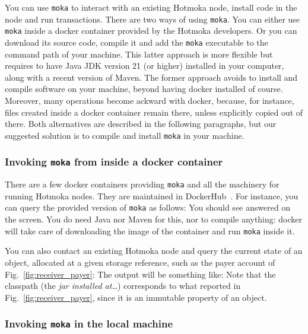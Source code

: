 You can use \texttt{moka} to interact with an existing Hotmoka node,
install code in the node and run transactions. There are two ways of using \texttt{moka}.
You can either use \texttt{moka} inside a docker container provided by the Hotmoka developers.
Or you can download its source code, compile it and add the \texttt{moka} executable to
the command path of your machine. This latter approach is more flexible but requires to have
Java JDK version 21 (or higher) installed in your
computer, along with a recent version of Maven. The former approach avoids to install
and compile software on your machine, beyond having docker installed of course.
Moreover, many operations become ackward with docker, because, for instance, files
created inside a docker container remain there, unless explicitly copied out of there.
Both alternatives are described in the following paragraphs, but
our suggested solution is to compile and install \texttt{moka} in your machine.

\subsubsection{Invoking \texttt{moka} from inside a docker container}
\label{subsubsec:moka_inside_docker}

There are a few docker containers providing \texttt{moka} and all the machinery
for running Hotmoka nodes. They are maintained in DockerHub~\cite{hotmoka_dockerhub}.
For instance, you can query the provided version of \texttt{moka} as follows:
%
%
You should see \texttt{\hotmokaVersion{}} answered on the screen.
You do need Java nor Maven for this, nor to compile anything: docker will take care
of downloading the image of the container and run \texttt{moka} inside it.

You can also contact an existing Hotmoka node and query the current state of an object,
allocated at a given storage reference, such as the payer account
of Fig.~\ref{fig:receiver_payer}:
%
%
The output will be something like:
%
%
Note that the classpath (the \emph{jar installed at\ldots}) corresponds to
what reported in Fig.~\ref{fig:receiver_payer}, since it is an immutable
property of an object.

\subsubsection{Invoking \texttt{moka} in the local machine}
\label{subsubsec:moka_local}

